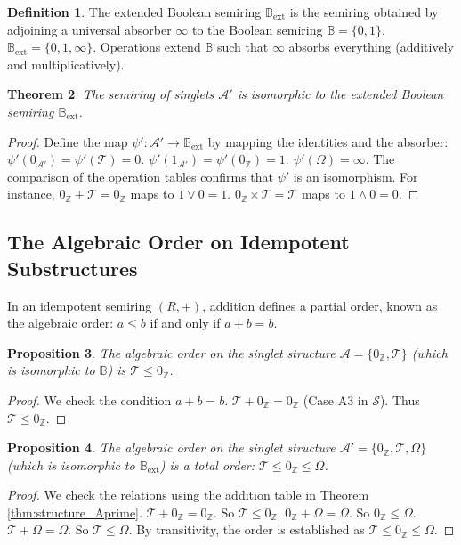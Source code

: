 \documentclass[11pt, a4paper]{article}
\theoremstyle{plain}
\newtheorem{theorem}{Theorem}[section]
\newtheorem{proposition}[theorem]{Proposition}
\theoremstyle{definition}
\newtheorem{definition}[theorem]{Definition}
\numberwithin{equation}{section}
\newcommand{\Z}{\mathbb{Z}}
\newcommand{\Tobj}{\mathcal{T}} %
\newcommand{\OmegaObj}{\Omega} %
\newcommand{\SemiringS}{\mathcal{S}}
\newcommand{\Bool}{\mathbb{B}} %
\newcommand{\BoolExt}{\mathbb{B}_{\mathrm{ext}}} %
\newcommand{\SetA}{\mathcal{A}}
\newcommand{\SetAPrime}{\mathcal{A}'}
\begin{document}
\begin{definition}
The extended Boolean semiring $\BoolExt$ is the semiring obtained by adjoining a universal absorber $\infty$ to the Boolean semiring $\Bool=\{0, 1\}$. $\BoolExt = \{0, 1, \infty\}$. Operations extend $\Bool$ such that $\infty$ absorbs everything (additively and multiplicatively).
\end{definition}

\begin{theorem}
The semiring of singlets $\SetAPrime$ is isomorphic to the extended Boolean semiring $\BoolExt$.
\end{theorem}
\begin{proof}
Define the map $\psi': \SetAPrime \to \BoolExt$ by mapping the identities and the absorber:
$\psi'(0_{\SetAPrime})=\psi'(\Tobj)=0$. $\psi'(1_{\SetAPrime})=\psi'(0_{\Z})=1$. $\psi'(\OmegaObj)=\infty$.
The comparison of the operation tables confirms that $\psi'$ is an isomorphism. For instance, $0_{\Z}+\Tobj=0_{\Z}$ maps to $1\lor 0 = 1$. $0_{\Z}\times\Tobj=\Tobj$ maps to $1\wedge 0 = 0$.
\end{proof}

\subsection{The Algebraic Order on Idempotent Substructures}

In an idempotent semiring $(R, +)$, addition defines a partial order, known as the algebraic order: $a \le b$ if and only if $a+b=b$.

\begin{proposition}\label{prop:order_A}
The algebraic order on the singlet structure $\SetA=\{0_{\Z}, \Tobj\}$ (which is isomorphic to $\Bool$) is $\Tobj \le 0_{\Z}$.
\end{proposition}
\begin{proof}
We check the condition $a+b=b$. $\Tobj+0_{\Z}=0_{\Z}$ (Case A3 in $\SemiringS$). Thus $\Tobj \le 0_{\Z}$.
\end{proof}

\begin{proposition}\label{prop:order_APrime}
The algebraic order on the singlet structure $\SetAPrime=\{0_{\Z}, \Tobj, \OmegaObj\}$ (which is isomorphic to $\BoolExt$) is a total order: $\Tobj \le 0_{\Z} \le \OmegaObj$.
\end{proposition}
\begin{proof}
We check the relations using the addition table in Theorem \ref{thm:structure_Aprime}.
$\Tobj+0_{\Z}=0_{\Z}$. So $\Tobj \le 0_{\Z}$.
$0_{\Z}+\OmegaObj=\OmegaObj$. So $0_{\Z} \le \OmegaObj$.
$\Tobj+\OmegaObj=\OmegaObj$. So $\Tobj \le \OmegaObj$.
By transitivity, the order is established as $\Tobj \le 0_{\Z} \le \OmegaObj$.
\end{proof}
\end{document}

